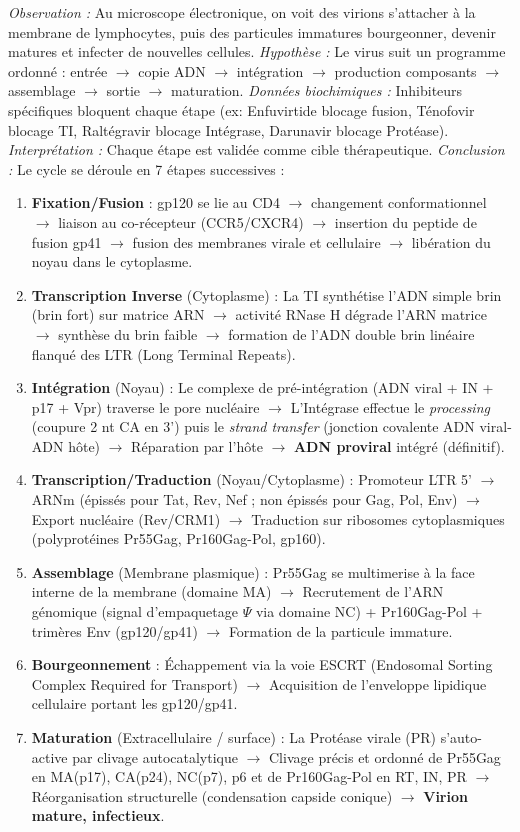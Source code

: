 \documentclass[11pt]{article}
\begin{document}
\begin{experience}
\emph{Observation :} Au microscope électronique, on voit des virions s'attacher à la membrane de lymphocytes, puis des particules immatures bourgeonner, devenir matures et infecter de nouvelles cellules.
\emph{Hypothèse :} Le virus suit un programme ordonné : entrée $\to$ copie ADN $\to$ intégration $\to$ production composants $\to$ assemblage $\to$ sortie $\to$ maturation.
\emph{Données biochimiques :} Inhibiteurs spécifiques bloquent chaque étape (ex: Enfuvirtide blocage fusion, Ténofovir blocage TI, Raltégravir blocage Intégrase, Darunavir blocage Protéase).
\emph{Interprétation :} Chaque étape est validée comme cible thérapeutique.
\emph{Conclusion :} Le cycle se déroule en 7 étapes successives :
\begin{enumerate}
    \item \textbf{Fixation/Fusion} : gp120 se lie au CD4 $\to$ changement conformationnel $\to$ liaison au co-récepteur (CCR5/CXCR4) $\to$ insertion du peptide de fusion gp41 $\to$ fusion des membranes virale et cellulaire $\to$ libération du noyau dans le cytoplasme.
    \item \textbf{Transcription Inverse} (Cytoplasme) : La TI synthétise l'ADN simple brin (brin fort) sur matrice ARN $\to$ activité RNase H dégrade l'ARN matrice $\to$ synthèse du brin faible $\to$ formation de l'ADN double brin linéaire flanqué des LTR (Long Terminal Repeats).
    \item \textbf{Intégration} (Noyau) : Le complexe de pré-intégration (ADN viral + IN + p17 + Vpr) traverse le pore nucléaire $\to$ L'Intégrase effectue le \emph{processing} (coupure 2 nt CA en 3') puis le \emph{strand transfer} (jonction covalente ADN viral-ADN hôte) $\to$ Réparation par l'hôte $\to$ \textbf{ADN proviral} intégré (définitif).
    \item \textbf{Transcription/Traduction} (Noyau/Cytoplasme) : Promoteur LTR 5' $\to$ ARNm (épissés pour Tat, Rev, Nef ; non épissés pour Gag, Pol, Env) $\to$ Export nucléaire (Rev/CRM1) $\to$ Traduction sur ribosomes cytoplasmiques (polyprotéines Pr55Gag, Pr160Gag-Pol, gp160).
    \item \textbf{Assemblage} (Membrane plasmique) : Pr55Gag se multimerise à la face interne de la membrane (domaine MA) $\to$ Recrutement de l'ARN génomique (signal d'empaquetage $\Psi$ via domaine NC) + Pr160Gag-Pol + trimères Env (gp120/gp41) $\to$ Formation de la particule immature.
    \item \textbf{Bourgeonnement} : Échappement via la voie ESCRT (Endosomal Sorting Complex Required for Transport) $\to$ Acquisition de l'enveloppe lipidique cellulaire portant les gp120/gp41.
    \item \textbf{Maturation} (Extracellulaire / surface) : La Protéase virale (PR) s'auto-active par clivage autocatalytique $\to$ Clivage précis et ordonné de Pr55Gag en MA(p17), CA(p24), NC(p7), p6 et de Pr160Gag-Pol en RT, IN, PR $\to$ Réorganisation structurelle (condensation capside conique) $\to$ \textbf{Virion mature, infectieux}.
\end{enumerate}
\end{experience}
\end{document}
